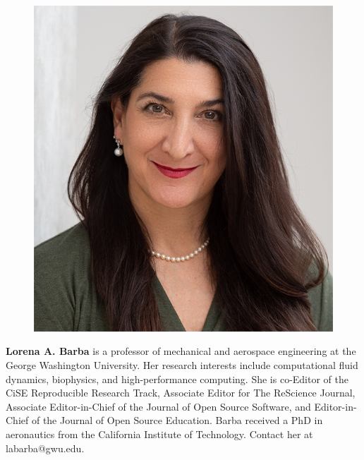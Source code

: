 \documentclass[10pt,journal,compsoc]{IEEEtran}
\begin{document}
\bigskip

\begin{figure}
\includegraphics[width=3 cm]{lorena_barba_130_2019.png}
\end{figure}
\noindent \textbf{Lorena A. Barba} is a professor of mechanical and aerospace engineering at the George Washington University. Her research interests include computational fluid dynamics, biophysics, and high-performance computing. She is co-Editor of the CiSE Reproducible Research Track, Associate Editor for The ReScience Journal, Associate Editor-in-Chief of the Journal of Open Source Software, and Editor-in-Chief of the Journal of Open Source Education. Barba received a PhD in aeronautics from the California Institute of Technology. Contact her at labarba@gwu.edu.




%
\end{document}
